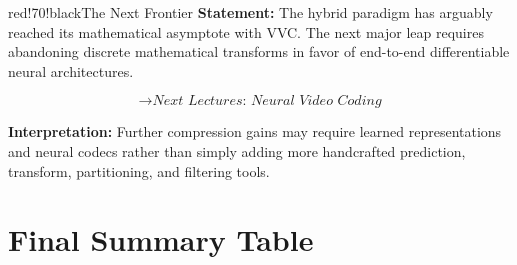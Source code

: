 \begin{calloutbox}{red!70!black}{The Next Frontier}
\textbf{Statement:} The hybrid paradigm has arguably reached its mathematical asymptote with VVC. The next major leap requires abandoning discrete mathematical transforms in favor of end-to-end differentiable neural architectures.

\[
\rightarrow \textit{Next Lectures: Neural Video Coding}
\]

\textbf{Interpretation:} Further compression gains may require learned representations and neural codecs rather than simply adding more handcrafted prediction, transform, partitioning, and filtering tools.
\end{calloutbox}

\section{Final Summary Table}

